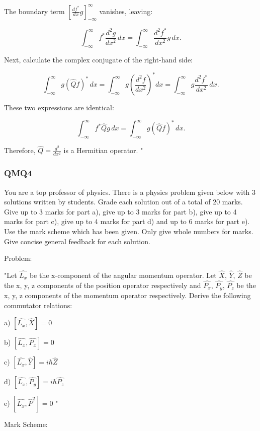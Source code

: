 The boundary term \( \left[ \frac{d f^*}{dx} g \right]_{-\infty}^\infty \) vanishes, leaving:

\[
\int_{-\infty}^\infty f^* \frac{d^2 g}{dx^2} \, dx = \int_{-\infty}^\infty \frac{d^2 f^*}{dx^2} g \, dx.
\]

Next, calculate the complex conjugate of the right-hand side:

\[
\int_{-\infty}^\infty g (\hat{Q} f)^* \, dx = \int_{-\infty}^\infty g \left(\frac{d^2 f}{dx^2}\right)^* dx = \int_{-\infty}^\infty g \frac{d^2 f^*}{dx^2} \, dx.
\]

These two expressions are identical:

\[
\int_{-\infty}^\infty f^* \hat{Q} g \, dx = \int_{-\infty}^\infty g (\hat{Q} f)^* \, dx.
\]

Therefore, \( \hat{Q} = \frac{d^2}{dx^2} \) is a Hermitian operator.
"

\subsubsection{QMQ4}

You are a top professor of physics. There is a physics problem given below with 3 solutions written by students. Grade each solution out of a total of 20 marks. Give up to 3 marks for part a), give up to 3 marks for part b), give up to 4 marks for part c), give up to 4 marks for part d) and up to 6 marks for part e). Use the mark scheme which has been given. Only give whole numbers for marks. Give concise general feedback for each solution. 

Problem:

"Let \( \hat{L_{x}} \) be the x-component of the angular momentum operator. Let \( \hat{X} \), \( \hat{Y} \), \( \hat{Z} \) be the x, y, z components of the position operator respectively and \( \hat{P_{x}} \), \( \hat{P_{y}} \), \( \hat{P_{z}} \)  be the x, y, z components of the momentum operator respectively. Derive the following commutator relations:

a) \( \left[ \hat{L_{x}}, \hat{X} \right] = 0 \)

b) \( \left[ \hat{L_{x}}, \hat{P_{x}} \right] = 0 \)

c) \( \left[ \hat{L_{x}}, \hat{Y} \right] = i \hbar \hat{Z} \)

d) \( \left[ \hat{L_{x}}, \hat{P_{y}} \right] = i \hbar \hat{P_{z}} \)

e) \( \left[ \hat{L_{x}}, \hat{P}^{2} \right] = 0 \) "

Mark Scheme:

